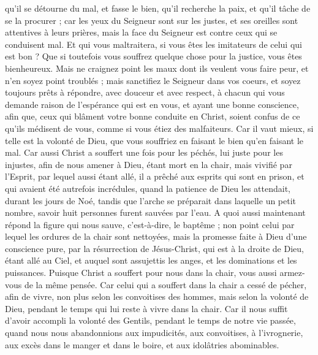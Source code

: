 \begin{multicols}{2}
qu'il se détourne du mal, et fasse le bien, qu'il recherche la paix, et qu'il tâche de se la procurer ;
car les yeux du Seigneur sont sur les justes, et ses oreilles sont attentives à leurs prières, mais la face du Seigneur est contre ceux qui se conduisent mal.
Et qui vous maltraitera, si vous êtes les imitateurs de celui qui est bon ?
Que si toutefois vous souffrez quelque chose pour la justice, vous êtes bienheureux. Mais ne craignez point les maux dont ils veulent vous faire peur, et n'en soyez point troublés ;
mais sanctifiez le Seigneur dans vos coeurs, et soyez toujours prêts à répondre, avec douceur et avec respect, à chacun qui vous demande raison de l'espérance qui est en vous, 
et ayant une bonne conscience, afin que, ceux qui blâment votre bonne conduite en Christ, soient confus de ce qu'ils médisent de vous, comme si vous étiez des malfaiteurs.
Car il vaut mieux, si telle est la volonté de Dieu, que vous souffriez en faisant le bien qu’en faisant le mal.
Car aussi Christ a souffert une fois pour les péchés, lui juste pour les injustes, afin de nous amener à Dieu, étant mort en la chair, mais vivifié par l'Esprit,
par lequel aussi étant allé, il a  prêché aux esprits qui sont en prison,
et qui avaient été autrefois incrédules, quand la patience de Dieu les attendait, durant les jours de Noé, tandis que l'arche se préparait dans laquelle un petit nombre, savoir huit personnes furent sauvées par l'eau.
A quoi aussi maintenant répond la figure qui nous sauve, c'est-à-dire, le baptême ; non point celui par lequel les ordures de la chair sont nettoyées, mais la promesse faite à Dieu d'une conscience pure, par la résurrection de Jésus-Christ,
qui est à la droite de Dieu, étant allé au Ciel, et auquel sont assujettis les anges, et les dominations et les puissances.
\VerseOne{}Puisque Christ a souffert pour nous dans la chair, vous aussi armez-vous de la même pensée. Car celui qui a souffert dans la chair a cessé de pécher,
afin de vivre, non plus selon les convoitises des hommes, mais selon la volonté de Dieu, pendant le temps qui lui reste à vivre dans la chair.
Car il nous suffit d'avoir accompli la volonté des Gentils, pendant le temps de notre vie passée, quand nous nous abandonnions aux impudicités, aux convoitises, à l'ivrognerie, aux excès dans le manger et dans le boire, et aux idolâtries abominables.

\end{multicols}
